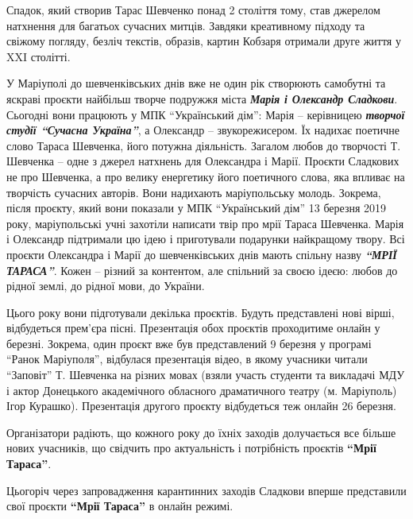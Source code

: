 Спадок, який створив Тарас Шевченко понад 2 століття тому, став джерелом
натхнення для багатьох сучасних митців. Завдяки креативному підходу та свіжому
погляду, безліч текстів, образів, картин Кобзаря отримали друге життя у XXI
столітті.

У Маріуполі до шевченківських днів вже не один рік створюють самобутні та
яскраві проєкти найбільш творче подружжя міста \emph{\textbf{Марія і Олександр Сладкови}}.
Сьогодні вони працюють у МПК \enquote{Український дім}: Марія – керівницею \emph{\textbf{творчої
студії \enquote{Сучасна Україна}}}, а Олександр – звукорежисером. Їх надихає поетичне
слово Тараса Шевченка, його потужна діяльність. Загалом любов до творчості
Т. Шевченка – одне з джерел натхнень для Олександра і Марії. Проєкти Сладкових
не про Шевченка, а про велику енергетику його поетичного слова, яка впливає на
творчість сучасних авторів. Вони надихають маріупольську молодь. Зокрема, після
проєкту, який вони показали у МПК \enquote{Український дім} 13 березня 2019 року,
маріупольські учні захотіли написати твір про мрії Тараса Шевченка. Марія і
Олександр підтримали цю ідею і приготували подарунки найкращому твору. Всі
проєкти Олександра і Марії до шевченківських днів мають спільну назву \emph{\textbf{\enquote{МРІЇ
ТАРАСА}}}. Кожен – різний за контентом, але спільний за своєю ідеєю: любов до
рідної землі, до рідної мови, до України.


Цього року вони підготували декілька проєктів. Будуть представлені нові вірші,
відбудеться прем'єра пісні. Презентація обох проєктів проходитиме онлайн у
березні. Зокрема, один проєкт вже був представлений 9 березня у програмі \enquote{Ранок
Маріуполя}, відбулася презентація відео, в якому учасники читали \enquote{Заповіт}
Т. Шевченка на різних мовах (взяли участь студенти та викладачі МДУ і актор
Донецького академічного обласного драматичного театру (м. Маріуполь) Ігор
Курашко). Презентація другого проєкту відбудеться теж  онлайн 26 березня.

Організатори радіють, що кожного року до їхніх заходів долучається все більше
нових учасників, що свідчить про актуальність і потрібність проєктів \textbf{\enquote{Мрії
Тараса}}.

Цьогоріч через запровадження карантинних заходів Сладкови вперше представили
свої проєкти \textbf{\enquote{Мрії Тараса}} в онлайн режимі.

